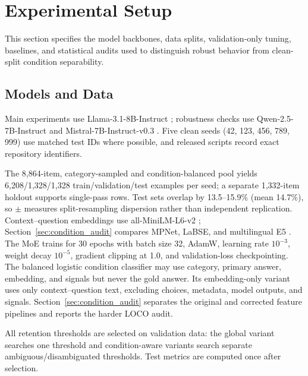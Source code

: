 \documentclass{ieeeaccess}
\begin{document}
\section{Experimental Setup}
\label{sec:setup}

This section specifies the model backbones, data splits, validation-only tuning, baselines, and statistical audits used to distinguish robust behavior from clean-split condition separability.

\subsection{Models and Data}
Main experiments use Llama-3.1-8B-Instruct \cite{meta2024llama31}; robustness checks use Qwen-2.5-7B-Instruct and Mistral-7B-Instruct-v0.3 \cite{yang2024qwen25,jiang2023mistral,mistralV03Card}. Five clean seeds (42, 123, 456, 789, 999) use matched test IDs where possible, and released scripts record exact repository identifiers.

The 8,864-item, category-sampled and condition-balanced pool yields 6,208/1,328/1,328 train/validation/test examples per seed; a separate 1,332-item holdout supports single-pass rows. Test sets overlap by 13.5--15.9\% (mean 14.7\%), so $\pm$ measures split-resampling dispersion rather than independent replication. Context--question embeddings use all-MiniLM-L6-v2 \cite{wang2020minilm,minilmL6Card}; Section~\ref{sec:condition_audit} compares MPNet, LaBSE, and multilingual E5 \cite{song2020mpnet,mpnetBaseV2Card,feng2022labse,wang2024multilinguale5}. The MoE trains for 30 epochs with batch size 32, AdamW, learning rate $10^{-3}$, weight decay $10^{-5}$, gradient clipping at 1.0, and validation-loss checkpointing. The balanced logistic condition classifier may use category, primary answer, embedding, and signals but never the gold answer. Its embedding-only variant uses only context--question text, excluding choices, metadata, model outputs, and signals. Section~\ref{sec:condition_audit} separates the original and corrected feature pipelines and reports the harder LOCO audit.

All retention thresholds are selected on validation data: the global variant searches one threshold and condition-aware variants search separate ambiguous/disambiguated thresholds. Test metrics are computed once after selection.
\end{document}
